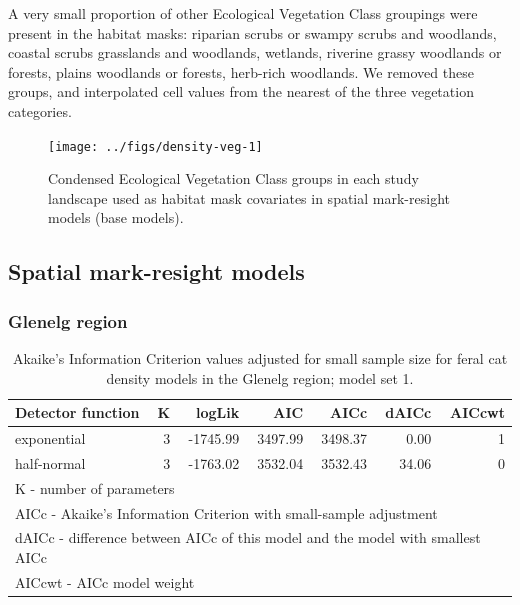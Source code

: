 \documentclass[preprint, 3p, authoryear]{elsarticle} %
\begin{document}
A very small proportion of other Ecological Vegetation Class groupings were present in the habitat masks: riparian scrubs or swampy scrubs and woodlands, coastal scrubs grasslands and woodlands, wetlands, riverine grassy woodlands or forests, plains woodlands or forests, herb-rich woodlands. We removed these groups, and interpolated cell values from the nearest of the three vegetation categories.

\newpage

\begin{figure}

{\centering \texttt{[image: ../figs/density-veg-1]} 

}

\caption{Condensed Ecological Vegetation Class groups in each study landscape used as habitat mask covariates in spatial mark-resight models (base models).}\label{fig:density-veg}
\end{figure}

\newpage

\hypertarget{spatial-mark-resight-models}{%
\subsection{Spatial mark-resight models}\label{spatial-mark-resight-models}}

\hypertarget{glenelg-region-3}{%
\subsubsection{Glenelg region}\label{glenelg-region-3}}

\begingroup\fontsize{10}{12}\selectfont

\begin{longtable}[t]{lrrrrrr}
\caption{\label{tab:density-aic-g-1}Akaike's Information Criterion values adjusted for small sample size for feral cat density models in the Glenelg region; model set 1.}\\
\toprule
Detector function & K & logLik & AIC & AICc & dAICc & AICcwt\\
\midrule
exponential & 3 & -1745.99 & 3497.99 & 3498.37 & 0.00 & 1\\
half-normal & 3 & -1763.02 & 3532.04 & 3532.43 & 34.06 & 0\\
\bottomrule
\multicolumn{7}{l}{\rule{0pt}{1em}K - number of parameters}\\
\multicolumn{7}{l}{\rule{0pt}{1em}AICc - Akaike's Information Criterion with small-sample adjustment}\\
\multicolumn{7}{l}{\rule{0pt}{1em}dAICc - difference between AICc of this model and the model with smallest AICc}\\
\multicolumn{7}{l}{\rule{0pt}{1em}AICcwt - AICc model weight}\\
\end{longtable}
\endgroup{}
\end{document}
